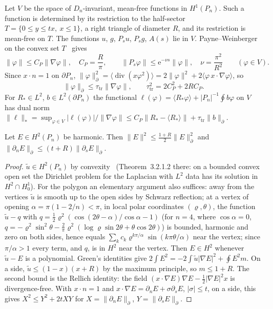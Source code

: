 \documentclass[11pt,a4paper]{report}
\DeclareRobustCommand*{\avg}[1]{\langle #1\rangle}
\DeclareRobustCommand*{\norm}[1]{\lVert #1\rVert}
\DeclareRobustCommand*{\bdnorm}[1]{\lVert #1\rVert_{\partial}}
\DeclareRobustCommand*{\dualnorm}[1]{\lVert #1\rVert_{*}}
\DeclareRobustCommand*{\ut}{\tilde u}
\DeclareRobustCommand*{\Pg}{P_n}
\begin{document}
Let \(V\) be the space of \(D_n\)-invariant, mean-free functions in \(H^1(\Pg)\). Such a function is determined by its
restriction to the half-sector \(T=\{0\le y\le tx,\ x\le1\}\), a right triangle of diameter \(R\), and its restriction
is mean-free on \(T\). The functions \(u\), \(g\), \(P_su\), \(P_sg\), \(A(s)\) lie in \(V\). Payne--Weinberger on the convex set
\(T\)~\autocite{PayneWeinberger1960,Bebendorf2003} gives
\begin{equation}\label{eq:PW}
\norm\varphi\le C_P\norm{\nabla\varphi},\quad C_P=\frac R\pi,\qquad \norm{P_s\varphi}\le\mathrm e^{-\nu s}\norm\varphi,\quad
\nu=\frac{\pi^2}{R^2}\qquad(\varphi\in V).
\end{equation}
Since \(x\cdot n=1\) on \(\partial\Pg\), \(\bdnorm\varphi^2=\avg{\operatorname{div}(x\varphi^2)}=2\norm\varphi^2+2\avg{\varphi\,x\cdot\nabla\varphi}\), so
\begin{equation}\label{eq:trace}
\bdnorm\varphi\le\tau_{\mathrm{tr}}\norm{\nabla\varphi},\qquad\tau_{\mathrm{tr}}^2=2C_P^2+2RC_P .
\end{equation}
For \(R_*\in L^2\), \(b\in L^2(\partial\Pg)\) the functional \(\ell(\varphi)=\avg{R_*\varphi}+|\Pg|^{-1}\oint b\varphi\) on
\(V\) has dual norm \(\dualnorm\ell=\sup_{\varphi\in V}|\ell(\varphi)|/\norm{\nabla\varphi}\le C_P\norm{R_*-\avg{R_*}}+\tau_{\mathrm{tr}}\bdnorm b\).

\begin{lemma}\label{lem:harmonic}
Let \(E\in H^2(\Pg)\) be harmonic. Then \(\norm E^2\le\frac{1+R}2\bdnorm E^2\) and
\(\bdnorm{\partial_nE}\le(t+R)\bdnorm{\partial_sE}\).
\end{lemma}
\begin{proof}
\(\ut\in H^2(\Pg)\) by convexity~\autocite{Grisvard1985} (Theorem~3.2.1.2 there: on a bounded convex open set the
Dirichlet problem for the Laplacian with \(L^2\) data has its solution in \(H^2\cap H^1_0\)). For the polygon an
elementary argument also suffices: away from the vertices \(\ut\) is smooth up to the open sides by Schwarz reflection;
at a vertex of opening \(\alpha=\pi(1-2/n)<\pi\), in local polar coordinates \((\varrho,\theta)\), the function
\(\ut-q\) with \(q=\frac12\varrho^2(\cos(2\theta-\alpha)/\cos\alpha-1)\) (for \(n=4\), where \(\cos\alpha=0\),
\(q=-\varrho^2\sin^2\theta-\frac2\pi\varrho^2(\log\varrho\sin2\theta+\theta\cos2\theta)\)) is bounded, harmonic and zero on both
sides, hence equals \(\sum_kc_k\varrho^{k\pi/\alpha}\sin(k\pi\theta/\alpha)\) near the vertex; since \(\pi/\alpha>1\) every term,
and \(q\), is in \(H^2\) near the vertex. Then \(E\in H^2\) whenever \(\ut-E\) is a polynomial. Green's identities give
\(2\int E^2=-2\int\ut|\nabla E|^2+\oint E^2m\). On a side, \(\ut\le(1-x)(x+R)\) by the maximum principle, so \(m\le1+R\).
The second bound is the Rellich identity: the field \((x\cdot\nabla E)\nabla E-\frac12|\nabla E|^2x\) is divergence-free. With
\(x\cdot n=1\) and \(x\cdot\nabla E=\partial_nE+\sigma\partial_sE\), \(|\sigma|\le t\), on a side, this gives
\(X^2\le Y^2+2tXY\) for \(X=\bdnorm{\partial_nE}\), \(Y=\bdnorm{\partial_sE}\).
\end{proof}
\end{document}
